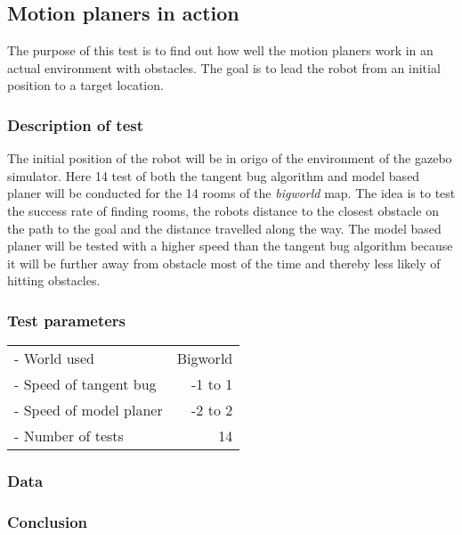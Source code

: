 \documentclass[../Head/Main.tex]{subfiles}
\begin{document}
\subsection{Motion planers in action}

The purpose of this test is to find out how well the motion planers work in an actual environment with obstacles. The goal is to lead the robot from an initial position to a target location. 

\subsubsection{Description of test}

The initial position of the robot will be in origo of the environment of the gazebo simulator. Here 14 test of both the tangent bug algorithm and model based planer will be conducted for the 14 rooms of the \textit{bigworld} map. The idea is to test the success rate of finding rooms, the robots distance to the closest obstacle on the path to the goal and the distance travelled along the way. The model based planer will be tested with a higher speed than the tangent bug algorithm because it will be further away from obstacle most of the time and thereby less likely of hitting obstacles.           

\subsubsection{Test parameters}

\begin{tabular}{l r}
	- World used                & Bigworld\\	
	- Speed of tangent bug      & -1 to 1\\
	- Speed of model planer     & -2 to 2\\
	- Number of tests           & 14
\end{tabular}

\subsubsection{Data}





\subsubsection{Conclusion}
\end{document}
